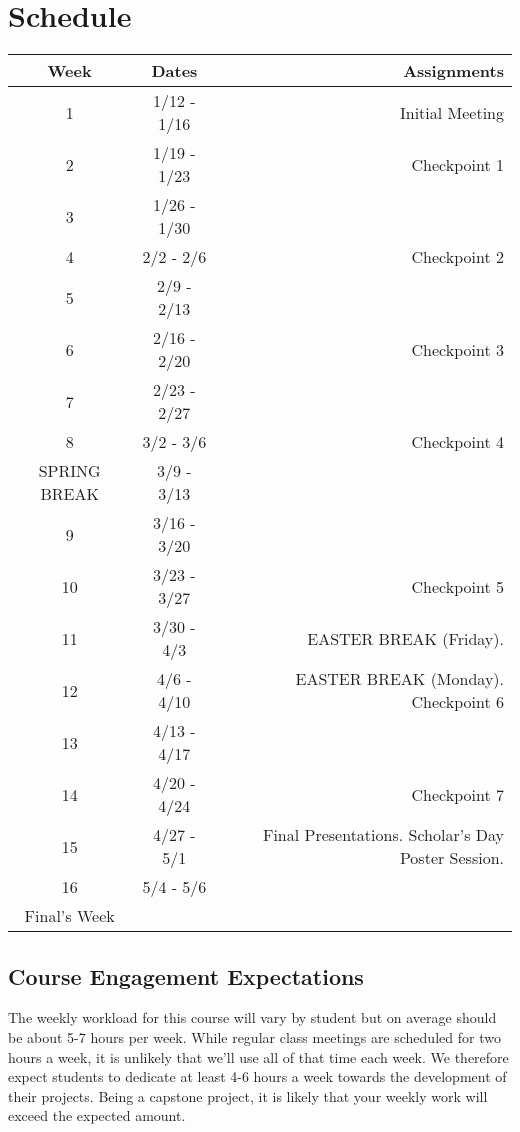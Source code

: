 \documentclass[10pt]{article}
\begin{document}
\section{Schedule}

\begin{center}
\begin{tabular}{|c|c|r|}
\hline 
Week & Dates & Assignments \\
\hline
1 & 1/12 - 1/16 & Initial Meeting \\
\hline
2 & 1/19 - 1/23 & Checkpoint 1\\
\hline
3 & 1/26 - 1/30 &   \\
\hline
4 & 2/2 - 2/6 &  Checkpoint 2 \\
\hline
5 & 2/9 - 2/13 &  \\
\hline
6 & 2/16 - 2/20 & Checkpoint 3 \\
\hline
7 & 2/23 - 2/27 &   \\
\hline
8 & 3/2 - 3/6 & Checkpoint 4  \\
\hline 
SPRING BREAK & 3/9 - 3/13 &  \\
\hline
9 & 3/16 - 3/20 & \\
\hline
10 & 3/23 - 3/27 & Checkpoint 5\\
\hline
11 & 3/30 - 4/3 & EASTER BREAK (Friday).\\
\hline
12 & 4/6 - 4/10 & EASTER BREAK (Monday). Checkpoint 6\\
\hline
13 & 4/13 - 4/17 &   \\
\hline
14 & 4/20 - 4/24 &  Checkpoint 7\\
\hline
15 & 4/27 - 5/1 & Final Presentations. Scholar's Day Poster Session. \\ 
\hline
16 & 5/4 - 5/6 & \\
\hline
Final's Week &  &  \\ 
\hline
\end{tabular}
\end{center}

\subsection{Course Engagement Expectations}

The weekly workload for this course will vary by student but on average should be about 5-7 hours per week.  While regular class meetings are scheduled for two hours a week, it is unlikely that we'll use all of that time each week.  We therefore expect students to dedicate at least 4-6 hours a week towards the development of their projects.  Being a capstone project, it is likely that your weekly work will exceed the expected amount.
\end{document}
